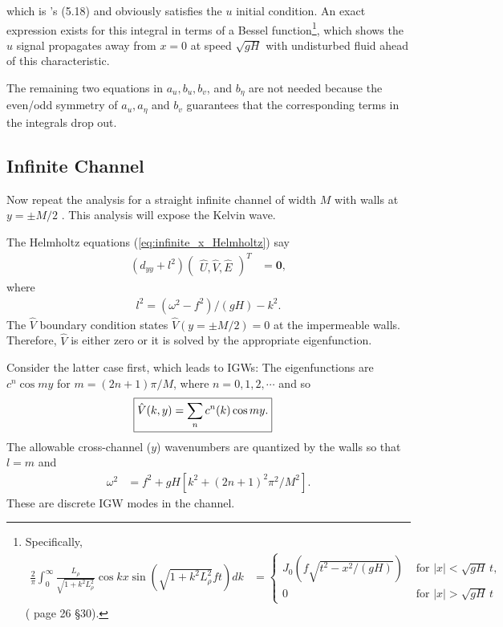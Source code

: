 \documentclass[10pt,reqno]{amsart}
\newcommand{\bfz}{{\mathbf 0}}
\begin{document}
which is \citeauthor{gill76}'s \citeyearpar{gill76} (5.18) and obviously satisfies the $u$ initial condition.
An exact expression exists for this integral in terms of a Bessel function\footnote{
Specifically, 
\begin{align}
\frac{2}{ \pi} \int_{0}^{\infty}  \frac{ L_\rho }{ \sqrt{1 + k^2 L_\rho^2 }} \cos k x \sin \left( \sqrt{1 + k^2 L_\rho^2 } f t \right) dk  & = 
\begin{cases}
J_0 \left( f \sqrt{t^2 - x^2/(g H) } \right) & \text{~for~} |x| < \sqrt{g H} \, t , \\
0 & \text{~for~} |x| > \sqrt{g H}  \, t 
\end{cases}
\end{align}
(\citealt{erdelyi_etal54} page 26 \S30).
}, which shows the $u$ signal propagates away from $x=0$ at speed $\sqrt{g H}$ with undisturbed fluid ahead of this characteristic.

The remaining two equations in $a_u, b_u, b_v$, and $b_\eta$ are not needed because the even/odd symmetry of $a_u, a_\eta$ and $b_v$ guarantees that the corresponding terms in the integrals drop out.

\subsection{Infinite Channel}
\label{sect:infinite_channel}
Now repeat the analysis for a straight infinite channel of width $M$ with walls at $y = \pm M/2$ \citep{gill76}.
This analysis will expose the Kelvin wave.

The Helmholtz equations (\ref{eq:infinite_x_Helmholtz}) say
\begin{align}
\left( d_{yy}  + l^2 \right) 
\begin{pmatrix}
\hat{U}, \hat{V}, \hat{E}\end{pmatrix}^T & = \bfz ,
\label{eqn:infinite_x_Helmholtz2}
\end{align}
where 
\begin{align}
l^2 = \left( \omega^2 - f^2\right)/\left( g H \right) - k^2 .
\label{eqn:l_definition}
\end{align}
The $\hat{V}$ boundary condition states $\hat{V}(y = \pm M/2) = 0$ at the impermeable walls.
Therefore, $\hat{V}$ is either zero or it is solved by the appropriate eigenfunction.

Consider the latter case first, which leads to IGWs: The eigenfunctions are $c^n \cos m y $ for $m = (2n+1) \pi / M$, where $n = 0, 1, 2, \cdots$ and so
\begin{align}
\Aboxed{
\hat{V}(k,y) & = \sum_n c^n(k) \cos m y .
\label{eqn:channel_V_hat}
}
\end{align}
The allowable cross-channel ($y$) wavenumbers are quantized by the walls so that $l = m$ and
\begin{align}
\omega^2 &= f^2 + g H \left[ k^2 + \left( 2 n + 1 \right)^2 \pi^2 / M^2\right] .
\end{align}
These are discrete IGW modes in the channel.
\end{document}
